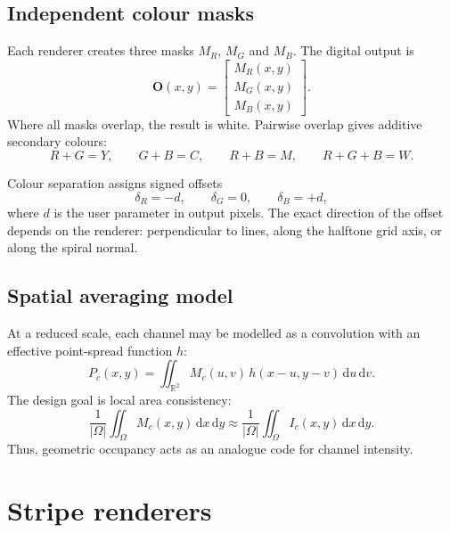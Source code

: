 \documentclass[10.5pt,a4paper]{article}
\begin{document}
\subsection{Independent colour masks}
Each renderer creates three masks $M_R$, $M_G$ and $M_B$. The digital output is
\begin{equation}
\mathbf{O}(x,y)=
\begin{bmatrix}
M_R(x,y)\\[2pt]M_G(x,y)\\[2pt]M_B(x,y)
\end{bmatrix}.
\end{equation}
Where all masks overlap, the result is white. Pairwise overlap gives additive secondary colours:
\begin{equation}
R+G=Y,\qquad G+B=C,\qquad R+B=M,\qquad R+G+B=W.
\end{equation}

Colour separation assigns signed offsets
\begin{equation}
\delta_R=-d,\qquad \delta_G=0,\qquad \delta_B=+d,
\end{equation}
where $d$ is the user parameter in output pixels. The exact direction of the offset depends on the renderer: perpendicular to lines, along the halftone grid axis, or along the spiral normal.

\subsection{Spatial averaging model}
At a reduced scale, each channel may be modelled as a convolution with an effective point-spread function $h$:
\begin{equation}
P_c(x,y)=\iint_{\mathbb{R}^2} M_c(u,v)\,h(x-u,y-v)\,\mathrm{d}u\,\mathrm{d}v.
\end{equation}
The design goal is local area consistency:
\begin{equation}
\frac{1}{|\Omega|}\iint_{\Omega}M_c(x,y)\,\mathrm{d}x\,\mathrm{d}y
\approx
\frac{1}{|\Omega|}\iint_{\Omega}I_c(x,y)\,\mathrm{d}x\,\mathrm{d}y.
\end{equation}
Thus, geometric occupancy acts as an analogue code for channel intensity.

\clearpage
\section{Stripe renderers}
\end{document}
